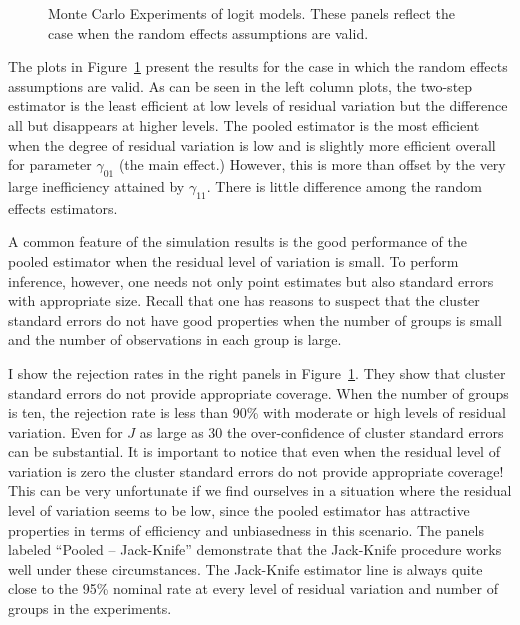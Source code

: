 \begin{figure}
  \centering
    \caption{Monte Carlo Experiments of logit models. These panels reflect the case when the random effects assumptions are valid.}
  \label{fig:re}
\end{figure}

The plots in Figure~\ref{fig:re} present the results for the case in which the random effects assumptions are valid. As can be seen in the left column plots, the two-step estimator is the least efficient at low levels of residual variation but the difference all but disappears at higher levels. The pooled estimator is the most efficient when the degree of residual variation is low and is slightly more efficient overall for parameter $\gamma_{01}$ (the main effect.)  However, this is more than offset by the very large inefficiency attained by $\gamma_{11}$.  There is little difference among the random effects estimators.

A common feature of the simulation results is the good performance of the pooled estimator when the residual level of variation is small. To perform inference, however, one needs not only point estimates but also standard errors with appropriate size.  Recall that one has reasons to suspect that the cluster standard errors do not have good properties when the number of groups is small and the number of observations in each group is large.

I show the rejection rates in the right panels in Figure~\ref{fig:re}. They show that cluster standard errors do not provide appropriate coverage. When the number of groups is ten, the rejection rate is less than 90\% with moderate or high levels of residual variation. Even for $J$ as large as 30 the over-confidence of cluster standard errors can be substantial.  It is important to notice that even when the residual level of variation is zero the cluster standard errors do not provide appropriate coverage! This can be very unfortunate if we find ourselves in a situation where the residual level of variation seems to be low, since the pooled estimator has attractive properties in terms of efficiency and unbiasedness in this scenario. The panels labeled ``Pooled -- Jack-Knife'' demonstrate that  the Jack-Knife procedure works well under these circumstances. The Jack-Knife estimator line is always quite close to the 95\% nominal rate at every level of residual variation and number of groups in the experiments.

